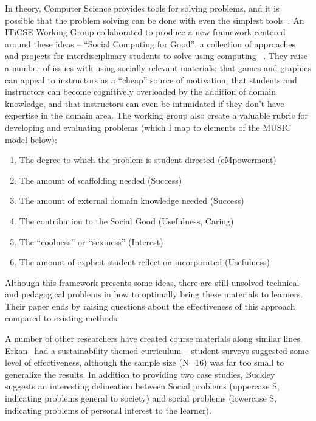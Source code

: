 In theory, Computer Science provides tools for solving problems, and it is possible that the problem solving can be done with even the simplest tools~\cite{Layman:2007, SocialGoodinComputingEducation}.
An ITiCSE Working Group collaborated to produce a new framework centered around these ideas -- ``Social Computing for Good'', a collection of approaches and projects for interdisciplinary students to solve using computing ~\cite{SocialGoodinComputingEducation}.
They raise a number of issues with using socially relevant materials: that games and graphics can appeal to instructors as a ``cheap'' source of motivation, that students and instructors can become cognitively overloaded by the addition of domain knowledge, and that instructors can even be intimidated if they don't have expertise in the domain area.
The working group also create a valuable rubric for developing and evaluating problems (which I map to elements of the MUSIC model below):
\begin{enumerate}
	\item The degree to which the problem is student-directed (eMpowerment)
	\item The amount of scaffolding needed (Success)
	\item The amount of external domain knowledge needed (Success)
	\item The contribution to the Social Good (Usefulness, Caring)
	\item The ``coolness'' or ``sexiness'' (Interest)
	\item The amount of explicit student reflection incorporated (Usefulness)
\end{enumerate}
Although this framework presents some ideas, there are still unsolved technical and pedagogical problems in how to optimally bring these materials to learners. Their paper ends by raising questions about the effectiveness of this approach compared to existing methods.

A number of other researchers have created course materials along similar lines.
Erkan~\cite{Erkan:2012} had a sustainability themed curriculum -- student surveys suggested some level of effectiveness, although the sample size (N=16) was far too small to generalize the results.
In addition to providing two case studies, Buckley ~\cite{Buckley:2008} suggests an interesting delineation between Social problems (uppercase S, indicating problems general to society) and social problems (lowercase S, indicating problems of personal interest to the learner).


